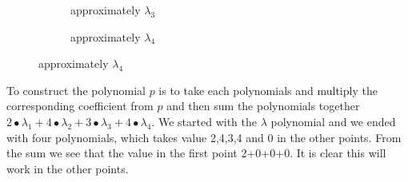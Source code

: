 \begin{figure}[H]
    \centering
    \captionsetup[subfigure]{labelformat=empty}
    \begin{subfigure}[b]{0.3\textwidth}
        \caption{approximately $\lambda_3$}
    \end{subfigure}
    \qquad %
    \qquad %
    \qquad %
    \qquad %
    \begin{subfigure}[b]{0.3\textwidth}
        \caption{approximately $\lambda_4$}
    \end{subfigure}
\end{figure}

\noindent
To construct the polynomial \begin{math}p\end{math} is to take each polynomials and multiply the corresponding coefficient from \begin{math}p\end{math} and then sum the polynomials together \begin{math}2∙\lambda_1+4∙\lambda_2+3∙\lambda_3+4∙\lambda_4 \end{math}. We started with the \begin{math}\lambda\end{math} polynomial and we ended with four polynomials, which takes value 2,4,3,4 and 0 in the other points. From the sum we see that the value in the first point 2+0+0+0. It is clear this will work in the other points. 

